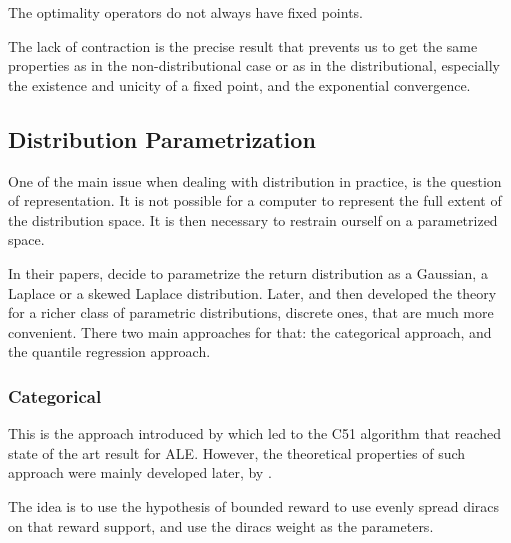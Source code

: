 \begin{proposition}
    The optimality operators do not always have fixed points.
\end{proposition}

The lack of contraction is the precise result that prevents us to get the same properties as in the non-distributional case or as in the distributional, especially the existence and unicity of a fixed point, and the exponential convergence.




















\subsection{Distribution Parametrization}

One of the main issue when dealing with distribution in practice, is the question of representation. It is not possible for a computer to represent the full extent of the distribution space. It is then necessary to restrain ourself on a parametrized space.

In their papers, \cite[Morimura et al.]{morimura_parametric_2012} decide to parametrize the return distribution as a Gaussian, a Laplace or a skewed Laplace distribution. Later, \cite[Bellemare et al.]{bellemare_distributional_2017} and then \cite[Dabney et al.]{dabney_distributional_2017} developed the theory for a richer class of parametric distributions, discrete ones, that are much more convenient. There two main approaches for that: the categorical approach, and the quantile regression approach.

\subsubsection*{Categorical}

This is the approach introduced by \cite[Bellemare et al.]{bellemare_distributional_2017} which led to the C51 algorithm that reached state of the art result for ALE. However, the theoretical properties of such approach were mainly developed later, by \cite[Rowland et al.]{rowland_analysis_2018}.

The idea is to use the hypothesis of bounded reward to use evenly spread diracs on that reward support, and use the diracs weight as the parameters.

